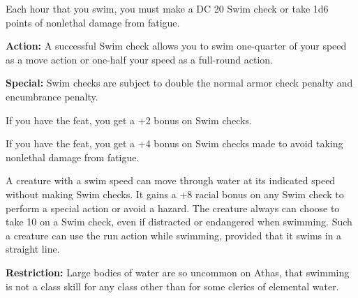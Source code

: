 Each hour that you swim, you must make a DC 20 Swim check or take 1d6 points of nonlethal damage from fatigue.

\textbf{Action:} A successful Swim check allows you to swim one-quarter of your speed as a move action or one-half your speed as a full-round action.

\textbf{Special:} Swim checks are subject to double the normal armor check penalty and encumbrance penalty.

If you have the  feat, you get a +2 bonus on Swim checks.

If you have the  feat, you get a +4 bonus on Swim checks made to avoid taking nonlethal damage from fatigue.

A creature with a swim speed can move through water at its indicated speed without making Swim checks. It gains a +8 racial bonus on any Swim check to perform a special action or avoid a hazard. The creature always can choose to take 10 on a Swim check, even if distracted or endangered when swimming. Such a creature can use the run action while swimming, provided that it swims in a straight line.

\textbf{Restriction:} Large bodies of water are so uncommon on Athas, that swimming is not a class skill for any class other than for some clerics of elemental water.
